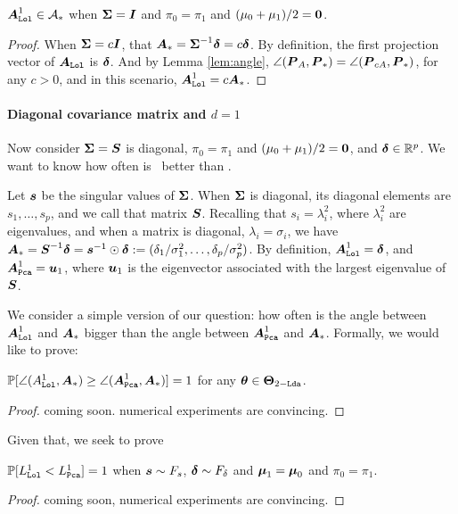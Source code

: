 \documentclass[10pt]{article}
\begin{document}
\begin{lem}
$\boldsymbol{A}_{{\sc \texttt{Lol}}}^1 \in \mathcal{A}_*$ when $\boldsymbol{\Sigma}=\boldsymbol{I}$ and $\pi_0=\pi_1$ and $(\mu_0+\mu_1)/2=\boldsymbol{0}$.
\end{lem}
\begin{proof}
When $\boldsymbol{\Sigma}=c \boldsymbol{I}$, that $\boldsymbol{A}_* = \boldsymbol{\Sigma}^{-1} \boldsymbol{\delta} = c \boldsymbol{\delta}$.
By definition, the first projection vector of $\boldsymbol{A}_{{\sc \texttt{Lol}}}$ is $\boldsymbol{\delta}$.
And by Lemma \ref{lem:angle}, $\angle(\boldsymbol{P}_A,\boldsymbol{P}_*)=\angle(\boldsymbol{P}_{c A},\boldsymbol{P}_*)$, for any $c>0$, and in this scenario, $\boldsymbol{A}_{{\sc \texttt{Lol}}}^1=c \boldsymbol{A}_*$.
\end{proof}


\paragraph{Diagonal covariance matrix and $d=1$}



Now consider $\boldsymbol{\Sigma}=\boldsymbol{S}$ is diagonal, $\pi_0=\pi_1$ and $(\mu_0+\mu_1)/2=\boldsymbol{0}$, and $\boldsymbol{\delta} \in \mathbb{R}^p$.
We want to know how often is \Lol~better than \Pca.  


Let $\boldsymbol{s}$ be the singular values of $\boldsymbol{\Sigma}$.  When $\boldsymbol{\Sigma}$ is diagonal, its diagonal elements are $s_1,\ldots,s_p$, and we call that matrix $\boldsymbol{S}$. 
Recalling that $s_i=\lambda_i^2$, where $\lambda_i^2$ are eigenvalues, and when a matrix is diagonal, $\lambda_i=\sigma_i$, we have  $\boldsymbol{A}_*=\boldsymbol{S}^{-1} \boldsymbol{\delta}=\boldsymbol{s}^{-1} \odot \boldsymbol{\delta}:=(\delta_1/\sigma_1^2,\ldots,\delta_p/\sigma_p^2)$.
By definition, $\boldsymbol{A}_{{\sc \texttt{Lol}}}^1=\boldsymbol{\delta}$, and $\boldsymbol{A}_{{\sc \texttt{Pca}}}^1=\boldsymbol{u}_1$, where $\boldsymbol{u}_1$ is the eigenvector associated with the largest eigenvalue of $\boldsymbol{S}$.  

We consider a simple version of our question: how often is the angle between $\boldsymbol{A}_{{\sc \texttt{Lol}}}^1$ and $\boldsymbol{A}_*$ bigger than the angle between $\boldsymbol{A}_{{\sc \texttt{Pca}}}^1$ and $\boldsymbol{A}_*$.  Formally, we would like to prove:

\begin{lem}
$\mathbb{P}[ \angle(A_{{\sc \texttt{Lol}}}^1,\boldsymbol{A}_*)  \geq  \angle(\boldsymbol{A}_{{\sc \texttt{Pca}}}^1,\boldsymbol{A}_*)]=1$ for any $\boldsymbol{\theta} \in \boldsymbol{\Theta}_{2-{\sc \texttt{Lda}}}$.
\end{lem}

\begin{proof}
coming soon.  numerical experiments are convincing.
\end{proof}



Given that, we seek to prove
\begin{lem}
$\mathbb{P}[L_{{\sc \texttt{Lol}}}^1 < L_{{\sc \texttt{Pca}}}^1]=1$ when $\boldsymbol{s} \sim F_s$, $\boldsymbol{\delta} \sim F_{\delta}$ and $\boldsymbol{\mu}_1=\boldsymbol{\mu}_0$ and $\pi_0=\pi_1$.
\end{lem}
\begin{proof}
coming soon, numerical experiments are convincing.
\end{proof}
\end{document}
